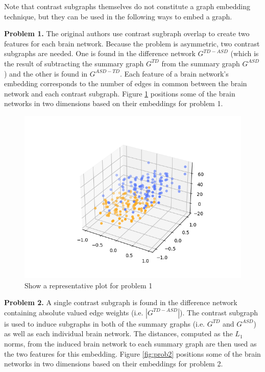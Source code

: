 \documentclass[letterpaper]{article}
\begin{document}
Note that contrast subgraphs themselves do not constitute a graph embedding technique, but they can be used in the following ways to embed a graph.

\textbf{Problem 1.}
The original authors use contrast sugbraph overlap to create two features for each brain network.
Because the problem is asymmetric, two contrast subgraphs are needed.
One is found in the difference network $G^{TD - ASD}$ (which is the result of subtracting the summary graph $G^{TD}$ from the summary graph $G^{ASD}$) and the other is found in $G^{ASD - TD}$.
Each feature of a brain network's embedding corresponds to the number of edges in common between the brain network and each contrast subgraph.
Figure \ref{fig:prob1} positions some of the brain networks in two dimensions based on their embeddings for problem 1. 

\begin{figure}
    \centering
    \includegraphics[width=\columnwidth, keepaspectratio=true]{test.png}
    \caption{Show a representative plot for problem 1}
    \label{fig:prob1}
\end{figure}

\textbf{Problem 2.}
A single contrast subgraph is found in the difference network containing absolute valued edge weights (i.e. $|G^{TD - ASD}|$).
The contrast subgraph is used to induce subgraphs in both of the summary graphs (i.e. $G^{TD}$ and $G^{ASD}$) as well as each individual brain network.
The distances, computed as the $L_1$ norms, from the induced brain network to each summary graph are then used as the two features for this embedding.
Figure \ref{fig:prob2} positions some of the brain networks in two dimensions based on their embeddings for problem 2. 
\end{document}
